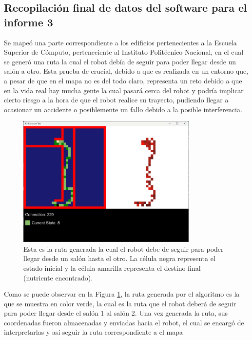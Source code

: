 \subsection{Recopilaci\'on final de datos del software para el informe 3}
    Se mape\'o una parte correspondiente a los edificios pertenecientes a la Escuela
        Superior de C\'omputo, perteneciente al Instituto Polit\'ecnico Nacional, en el cual se
        gener\'o una ruta la cual el robot deb\'ia de seguir para poder llegar desde un sal\'on a otro.
        Esta prueba de crucial, debido a que es realizada en un entorno que, a pesar de que en
        el mapa no es del todo claro, representa un reto debido a que en la vida real hay mucha
        gente la cual pasar\'a cerca del robot y podr\'ia implicar cierto riesgo a la hora de que el
        robot realice su trayecto, pudiendo llegar a ocasionar un accidente o posiblemente un
        fallo debido a la posible interferencia.
    \vskip 0.5cm
    \begin{figure}[h!]
        \centering
        \includegraphics[width=0.8\textwidth]{./images/Pruebas/Imagen1.png}
        \caption{Esta es la ruta generada la cual el robot debe de seguir para poder llegar desde un sal\'on
            hasta el otro. La c\'elula negra representa el estado inicial y la c\'elula amarilla representa
            el destino final (nutriente encontrado).}
        \label{fig:Mapa_ESCOM}
    \end{figure}
    \vskip 0.5cm
    Como se puede observar en la Figura \ref{fig:Mapa_ESCOM}, la ruta generada por el algoritmo
        es la que se muestra en color verde, la cual es la ruta que el robot deber\'a de seguir para
        poder llegar desde el sal\'on 1 al sal\'on 2. Una vez generada la ruta, sus coordenadas fueron almacenadas y enviadas hacia el
        robot, el cual se encarg\'o de interpretarlas y as\'i seguir la ruta correspondiente a el mapa
